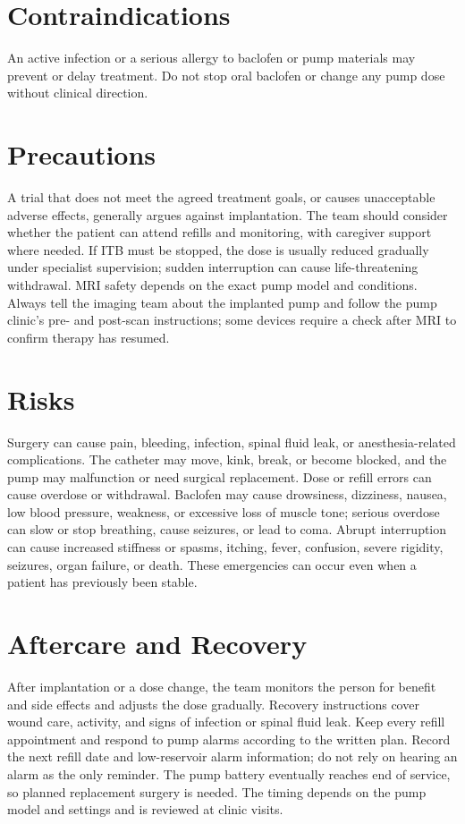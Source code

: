\section*{Contraindications}
An active infection or a serious allergy to baclofen or pump materials may prevent or delay treatment. Do not stop oral baclofen or change any pump dose without clinical direction.

\section*{Precautions}
A trial that does not meet the agreed treatment goals, or causes unacceptable adverse effects, generally argues against implantation. The team should consider whether the patient can attend refills and monitoring, with caregiver support where needed. If ITB must be stopped, the dose is usually reduced gradually under specialist supervision; sudden interruption can cause life-threatening withdrawal. MRI safety depends on the exact pump model and conditions. Always tell the imaging team about the implanted pump and follow the pump clinic's pre- and post-scan instructions; some devices require a check after MRI to confirm therapy has resumed.

\section*{Risks}
Surgery can cause pain, bleeding, infection, spinal fluid leak, or anesthesia-related complications. The catheter may move, kink, break, or become blocked, and the pump may malfunction or need surgical replacement. Dose or refill errors can cause overdose or withdrawal. Baclofen may cause drowsiness, dizziness, nausea, low blood pressure, weakness, or excessive loss of muscle tone; serious overdose can slow or stop breathing, cause seizures, or lead to coma. Abrupt interruption can cause increased stiffness or spasms, itching, fever, confusion, severe rigidity, seizures, organ failure, or death. These emergencies can occur even when a patient has previously been stable.

\section*{Aftercare and Recovery}
After implantation or a dose change, the team monitors the person for benefit and side effects and adjusts the dose gradually. Recovery instructions cover wound care, activity, and signs of infection or spinal fluid leak. Keep every refill appointment and respond to pump alarms according to the written plan. Record the next refill date and low-reservoir alarm information; do not rely on hearing an alarm as the only reminder. The pump battery eventually reaches end of service, so planned replacement surgery is needed. The timing depends on the pump model and settings and is reviewed at clinic visits.

